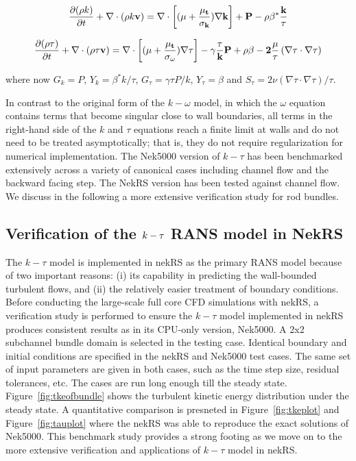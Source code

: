 \begin{equation}
    \frac{\partial (\rho k)}{\partial t} + \nabla\cdot(\rho k \bf{v}) =  \nabla\cdot\left[(\mu+\frac{\mu_t}{\sigma_k})\nabla k\right] + P-\rho \beta^{*}\frac{k}{\tau}
\end{equation}

\begin{equation}
 \frac{\partial (\rho \tau)}{\partial t} + \nabla\cdot(\rho\tau \bf{v}) =  \nabla\cdot\left[(\mu+\frac{\mu_t}{\sigma_\omega })\nabla \tau \right] - \gamma \frac{\tau}{k} P+\rho \beta-2\frac{\mu}{\tau}\left(\nabla\tau\cdot\nabla\tau\right)
\end{equation}

where now $G_k=P$, $Y_k=\beta^{*}k/\tau$, $G_\tau=\gamma\tau P/k$, $Y_\tau=\beta$ and $S_\tau=2\nu\left(\nabla\tau\cdot\nabla\tau\right)/\tau$.

In contrast to the original form of the $k-\omega$ model, in which the $\omega$ equation contains
terms that become singular close to  wall boundaries, all terms in the right-hand side of the $k$ and $\tau$ equations reach a finite  limit at walls and do not need to be treated  asymptotically; that is, they do not require regularization for numerical implementation. The Nek5000 version of  $k-\tau$ has been benchmarked extensively across a variety of canonical cases including channel flow and the backward facing step. The NekRS version has been tested against channel flow. We discuss in the following a more extensive verification study for rod bundles.

\subsection{Verification of the $\lowercase{k}-\tau$ RANS model in NekRS}
\label{sec:nrs1}
The $k-\tau$ model is implemented in nekRS as the primary RANS model because of two important reasons: (i) its capability in predicting the wall-bounded turbulent flows, and (ii) the relatively easier treatment of boundary conditions. Before conducting the large-scale full core CFD simulations with nekRS, a verification study is performed to ensure the $k-\tau$ model implemented in nekRS produces consistent results as in its CPU-only version, Nek5000. A 2x2 subchannel bundle domain is selected in the testing case. Identical boundary and initial conditions are specified in the nekRS and Nek5000 test cases. The same set of input parameters are given in both cases, such as the time step size, residual tolerances, etc. The cases are run long enough till the steady state. Figure~\ref{fig:tkeofbundle} shows the turbulent kinetic energy distribution under the steady state. A quantitative comparison is presneted in Figure~\ref{fig:tkeplot} and Figure~\ref{fig:tauplot} where the nekRS was able to reproduce the exact solutions of Nek5000. This benchmark study provides a strong footing as we move on to the more extensive  verification and applications of $k-\tau$ model in nekRS.

